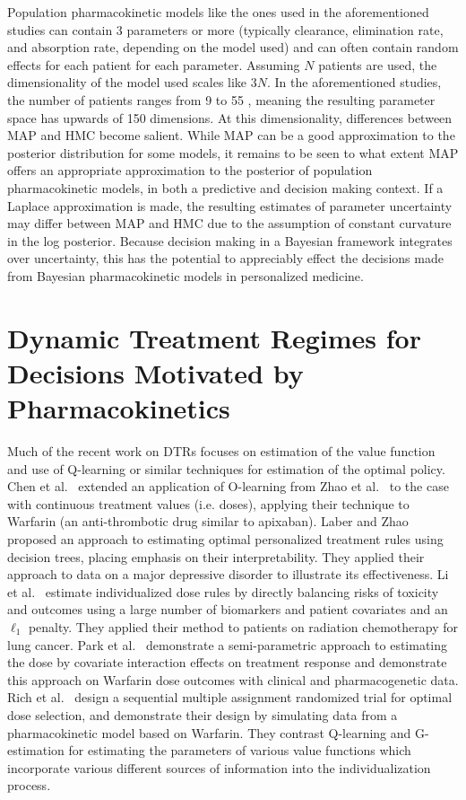 Population pharmacokinetic models like the ones used in the aforementioned studies can contain 3 parameters or more (typically clearance, elimination rate, and absorption rate, depending on the model used) and can often contain random effects for each patient for each parameter.  Assuming $N$ patients are used, the dimensionality of the model used scales like $3N$.  In the aforementioned studies, the number of patients ranges from 9 \cite{gibert2022development} to 55 \cite{sturkenboom2015pharmacokinetic}, meaning the resulting parameter space has upwards of 150 dimensions.  At this dimensionality, differences between MAP and HMC become salient. While MAP can be a good approximation to the posterior distribution for some models, it remains to be seen to what extent MAP offers an appropriate approximation to the posterior of population pharmacokinetic models, in both a predictive and decision making context.  If a Laplace approximation is made, the resulting estimates of parameter uncertainty may differ between MAP and HMC due to the assumption of constant curvature in the log posterior.  Because decision making in a Bayesian framework integrates over uncertainty, this has the potential to appreciably effect the decisions made from Bayesian pharmacokinetic models in personalized medicine.

\section{Dynamic Treatment Regimes for Decisions Motivated by Pharmacokinetics}

Much of the recent work on DTRs focuses on estimation of the value function and use of Q-learning or similar techniques for estimation of the optimal policy. Chen et al.\ \cite{chen2016personalized} extended an application of O-learning from Zhao et al.\ \cite{zhao2012estimating} to the case with continuous treatment values (i.e. doses), applying their technique to Warfarin (an anti-thrombotic drug similar to apixaban).  Laber and Zhao \cite{laber2015tree} proposed an approach to estimating optimal personalized treatment rules using decision trees, placing emphasis on their interpretability.  They applied their approach to data on a major depressive disorder to illustrate its effectiveness. Li et al.\ \cite{li2020utility} estimate individualized dose rules by directly balancing risks of toxicity and outcomes using a large number of biomarkers and patient covariates and an $\ell_1$ penalty.  They applied their method to patients on radiation chemotherapy for lung cancer. Park et al.\ \cite{park2021single} demonstrate a semi-parametric approach to estimating the dose by covariate interaction effects on treatment response and demonstrate this approach on Warfarin dose outcomes with clinical and pharmacogenetic data.  Rich et al.\ \cite{rich2014simulating} design a sequential multiple assignment randomized trial for optimal dose selection, and demonstrate their design by simulating data from a pharmacokinetic model based on Warfarin. They contrast Q-learning and G-estimation for estimating the parameters of various value functions which incorporate various different sources of information into the individualization process. 

